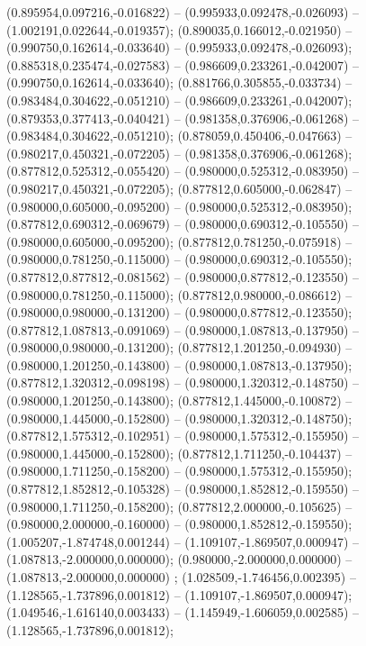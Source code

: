  (0.895954,0.097216,-0.016822) -- (0.995933,0.092478,-0.026093) -- (1.002191,0.022644,-0.019357);
 (0.890035,0.166012,-0.021950) -- (0.990750,0.162614,-0.033640) -- (0.995933,0.092478,-0.026093);
 (0.885318,0.235474,-0.027583) -- (0.986609,0.233261,-0.042007) -- (0.990750,0.162614,-0.033640);
 (0.881766,0.305855,-0.033734) -- (0.983484,0.304622,-0.051210) -- (0.986609,0.233261,-0.042007);
 (0.879353,0.377413,-0.040421) -- (0.981358,0.376906,-0.061268) -- (0.983484,0.304622,-0.051210);
 (0.878059,0.450406,-0.047663) -- (0.980217,0.450321,-0.072205) -- (0.981358,0.376906,-0.061268);
 (0.877812,0.525312,-0.055420) -- (0.980000,0.525312,-0.083950) -- (0.980217,0.450321,-0.072205);
 (0.877812,0.605000,-0.062847) -- (0.980000,0.605000,-0.095200) -- (0.980000,0.525312,-0.083950);
 (0.877812,0.690312,-0.069679) -- (0.980000,0.690312,-0.105550) -- (0.980000,0.605000,-0.095200);
 (0.877812,0.781250,-0.075918) -- (0.980000,0.781250,-0.115000) -- (0.980000,0.690312,-0.105550);
 (0.877812,0.877812,-0.081562) -- (0.980000,0.877812,-0.123550) -- (0.980000,0.781250,-0.115000);
 (0.877812,0.980000,-0.086612) -- (0.980000,0.980000,-0.131200) -- (0.980000,0.877812,-0.123550);
 (0.877812,1.087813,-0.091069) -- (0.980000,1.087813,-0.137950) -- (0.980000,0.980000,-0.131200);
 (0.877812,1.201250,-0.094930) -- (0.980000,1.201250,-0.143800) -- (0.980000,1.087813,-0.137950);
 (0.877812,1.320312,-0.098198) -- (0.980000,1.320312,-0.148750) -- (0.980000,1.201250,-0.143800);
 (0.877812,1.445000,-0.100872) -- (0.980000,1.445000,-0.152800) -- (0.980000,1.320312,-0.148750);
 (0.877812,1.575312,-0.102951) -- (0.980000,1.575312,-0.155950) -- (0.980000,1.445000,-0.152800);
 (0.877812,1.711250,-0.104437) -- (0.980000,1.711250,-0.158200) -- (0.980000,1.575312,-0.155950);
 (0.877812,1.852812,-0.105328) -- (0.980000,1.852812,-0.159550) -- (0.980000,1.711250,-0.158200);
 (0.877812,2.000000,-0.105625) -- (0.980000,2.000000,-0.160000) -- (0.980000,1.852812,-0.159550);
 (1.005207,-1.874748,0.001244) -- (1.109107,-1.869507,0.000947) -- (1.087813,-2.000000,0.000000);
 (0.980000,-2.000000,0.000000) -- (1.087813,-2.000000,0.000000) ;
 (1.028509,-1.746456,0.002395) -- (1.128565,-1.737896,0.001812) -- (1.109107,-1.869507,0.000947);
 (1.049546,-1.616140,0.003433) -- (1.145949,-1.606059,0.002585) -- (1.128565,-1.737896,0.001812);
